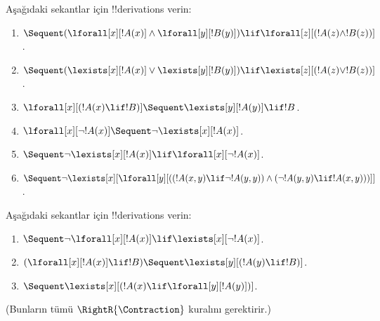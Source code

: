 \documentclass[../../../include/open-logic-section]{subfiles}
\begin{document}
\begin{prob}
Aşağıdaki sekantlar için !!{derivation}s verin:
\begin{enumerate}
\item $\Sequent (\lforall[x][!A(x)] \land \lforall[y][!B(y)]) \lif
\lforall[z][(!A(z) \land !B(z))]$.
\item $\Sequent (\lexists[x][!A(x)] \lor \lexists[y][!B(y)]) \lif
\lexists[z][(!A(z) \lor !B(z))]$.
\item $\lforall[x][(!A(x) \lif !B)] \Sequent \lexists[y][!A(y)] \lif !B$.
\item $\lforall[x][\lnot !A(x)] \Sequent \lnot\lexists[x][!A(x)]$.
\item $\Sequent \lnot\lexists[x][!A(x)] \lif \lforall[x][\lnot !A(x)]$.
\item $\Sequent \lnot\lexists[x][\lforall[y][((!A(x,y) \lif \lnot
!A(y,y)) \land (\lnot !A(y,y) \lif !A(x,y)))]]$.
\end{enumerate}
\end{prob}

\begin{prob}
Aşağıdaki sekantlar için !!{derivation}s verin:
\begin{enumerate}
\item $\Sequent \lnot\lforall[x][!A(x)] \lif \lexists[x][\lnot!A(x)]$.
\item $(\lforall[x][!A(x)] \lif !B) \Sequent \lexists[y][(!A(y) \lif !B)]$.
\item $\Sequent \lexists[x][(!A(x) \lif \lforall[y][!A(y)])]$.
\end{enumerate}
(Bunların tümü $\RightR{\Contraction}$ kuralını gerektirir.)
\end{prob}
\end{document}

